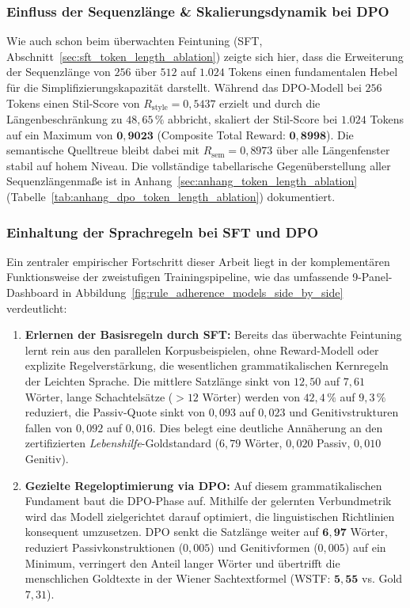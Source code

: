 \subsubsection{Einfluss der Sequenzlänge \& Skalierungsdynamik bei DPO}
\label{sec:dpo_token_length_ablation}

Wie auch schon beim überwachten Feintuning (SFT, Abschnitt~\ref{sec:sft_token_length_ablation}) zeigte sich hier, dass die Erweiterung der Sequenzlänge von $256$ über $512$ auf $1.024$ Tokens einen fundamentalen Hebel für die Simplifizierungskapazität darstellt. Während das DPO-Modell bei $256$ Tokens einen Stil-Score von $R_{\text{style}} = 0{,}5437$ erzielt und durch die Längenbeschränkung zu $48{,}65\,\%$ abbricht, skaliert der Stil-Score bei $1.024$ Tokens auf ein Maximum von $\mathbf{0{,}9023}$ (Composite Total Reward: $\mathbf{0{,}8998}$). Die semantische Quelltreue bleibt dabei mit $R_{\text{sem}} = 0{,}8973$ über alle Längenfenster stabil auf hohem Niveau. Die vollständige tabellarische Gegenüberstellung aller Sequenzlängenmaße ist in Anhang~\ref{sec:anhang_token_length_ablation} (Tabelle~\ref{tab:anhang_dpo_token_length_ablation}) dokumentiert.

\subsubsection{Einhaltung der Sprachregeln bei SFT und DPO}
\label{sec:dpo_rule_adherence}

Ein zentraler empirischer Fortschritt dieser Arbeit liegt in der komplementären Funktionsweise der zweistufigen Trainingspipeline, wie das umfassende 9-Panel-Dashboard in Abbildung~\ref{fig:rule_adherence_models_side_by_side} verdeutlicht:

\begin{enumerate}
    \item \textbf{Erlernen der Basisregeln durch SFT:} Bereits das überwachte Feintuning lernt rein aus den parallelen Korpusbeispielen, ohne Reward-Modell oder explizite Regelverstärkung, die wesentlichen grammatikalischen Kernregeln der Leichten Sprache. Die mittlere Satzlänge sinkt von $12{,}50$ auf $7{,}61$ Wörter, lange Schachtelsätze ($>12$ Wörter) werden von $42{,}4\,\%$ auf $9{,}3\,\%$ reduziert, die Passiv-Quote sinkt von $0{,}093$ auf $0{,}023$ und Genitivstrukturen fallen von $0{,}092$ auf $0{,}016$. Dies belegt eine deutliche Annäherung an den zertifizierten \textit{Lebenshilfe}-Goldstandard ($6{,}79$ Wörter, $0{,}020$ Passiv, $0{,}010$ Genitiv).
    \item \textbf{Gezielte Regeloptimierung via DPO:} Auf diesem grammatikalischen Fundament baut die DPO-Phase auf. Mithilfe der gelernten Verbundmetrik wird das Modell zielgerichtet darauf optimiert, die linguistischen Richtlinien konsequent umzusetzen. DPO senkt die Satzlänge weiter auf $\mathbf{6{,}97}$ Wörter, reduziert Passivkonstruktionen ($0{,}005$) und Genitivformen ($0{,}005$) auf ein Minimum, verringert den Anteil langer Wörter und übertrifft die menschlichen Goldtexte in der Wiener Sachtextformel (WSTF: $\mathbf{5{,}55}$ vs. Gold $7{,}31$).
\end{enumerate}

